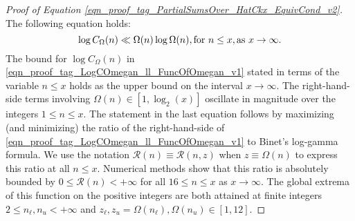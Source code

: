 \documentclass[11pt,reqno,a4letter]{article}
\numberwithin{equation}{section}
\numberwithin{figure}{section}
\numberwithin{table}{section}
\theoremstyle{plain}
\numberwithin{theorem}{section}
\theoremstyle{definition}
\theoremstyle{remark}
\newcommand{\mathtext}[1]{\text{\rm #1}}
\begin{document}
\begin{proof}[Proof of Equation \eqref{eqn_proof_tag_PartialSumsOver_HatCkx_EquivCond_v2}]
The following equation holds:
\begin{equation}
\label{eqn_proof_tag_LogCOmegan_ll_FuncOfOmegan_v1}
\log C_{\Omega}(n) \ll \Omega(n) \log \Omega(n), \mathtext{ for } n \leq x, 
     \mathtext{ as } x \rightarrow \infty. 
\end{equation}
The bound for $\log C_{\Omega}(n)$ in 
\eqref{eqn_proof_tag_LogCOmegan_ll_FuncOfOmegan_v1} stated in terms of the variable 
$n \leq x$ holds as the upper bound on the interval $x \rightarrow \infty$. 
The right-hand-side terms involving $\Omega(n) \in [1, \log_2(x)]$ 
oscillate in magnitude over the integers $1 \leq n \leq x$. 
The statement in the last equation follows by 
maximizing (and minimizing) the ratio of the right-hand-side of 
\eqref{eqn_proof_tag_LogCOmegan_ll_FuncOfOmegan_v1} to 
Binet's log-gamma formula. 
We use the notation $\mathcal{R}(n) \equiv \mathcal{R}(n, z)$ when 
$z \equiv \Omega(n)$ to express this ratio at all $n \leq x$. 
Numerical methods show that this ratio is absolutely bounded by 
$0 \leq \mathcal{R}(n) < +\infty$ for all $16 \leq n \leq x$ as $x \rightarrow \infty$. 
The global extrema of this function on the positive integers 
are both attained at finite integers $2 \leq n_{\ell}, n_u < +\infty$ and 
$z_{\ell},z_u = \Omega(n_{\ell}), \Omega(n_u) \in [1, 12]$. 


\end{proof}
\end{document}
